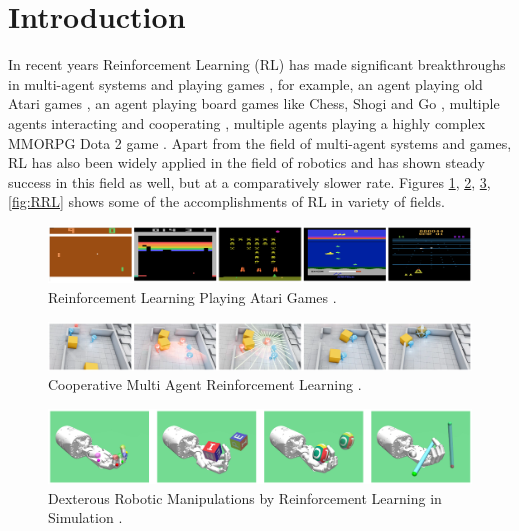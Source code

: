 \section{Introduction}

In recent years Reinforcement Learning (RL) has made significant breakthroughs in multi-agent systems \cite{oroojlooyjadid2021review} and playing games \cite{shao2019survey}, for example, an agent playing old Atari games \cite{mnih2013playing}, an agent playing board games like Chess, Shogi and Go \cite{silver2017mastering} \cite{alphago}, multiple agents interacting and cooperating \cite{baker2020emergent}, multiple agents playing a highly complex MMORPG Dota 2 game \cite{openai2019dota}. Apart from the field of multi-agent systems and games, RL has also been widely applied in the field of robotics \cite{robotics2030122} \cite{RLRS} \cite{RLR} \cite{openai2019learning} \cite{zhu2020ingredients} and has shown steady success in this field as well, but at a comparatively slower rate. Figures \ref{fig:GRL}, \ref{fig:MARL}, \ref{fig:RRL1}, \ref{fig:RRL} shows some of the accomplishments of RL in variety of fields. \\

\begin{figure}[h!]
    \centering
    \includegraphics[width=\textwidth]{images/GRL.png}
    \caption{Reinforcement Learning Playing Atari Games \cite{mnih2013playing}.}
    \label{fig:GRL}
\end{figure}

\begin{figure}[h!]
    \centering
    \includegraphics[width=\textwidth]{images/MARL.png}
    \caption{Cooperative Multi Agent Reinforcement Learning \cite{baker2020emergent}.}
    \label{fig:MARL}
\end{figure}

\begin{figure}[h!]
    \centering
    \includegraphics[width=\textwidth]{images/RRL1.png}
    \caption{Dexterous Robotic Manipulations by Reinforcement Learning in Simulation \cite{plappert2018multigoal}.}
    \label{fig:RRL1}
\end{figure}

